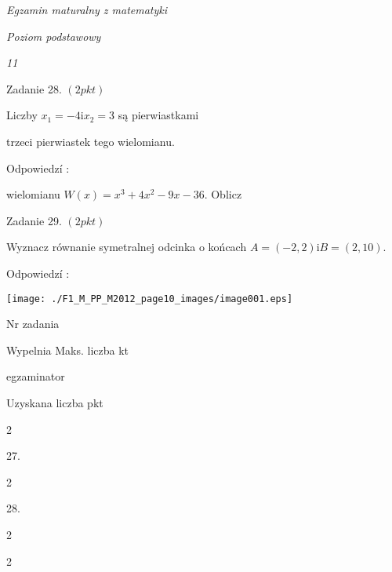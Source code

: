 \documentclass[a4paper,12pt]{article}
\begin{document}
{\it Egzamin maturalny z matematyki}

{\it Poziom podstawowy}

{\it 11}

Zadanie 28. $(2pkt)$

Liczby $x_{1}=-4 \mathrm{i} x_{2}=3$ są pierwiastkami

trzeci pierwiastek tego wielomianu.

Odpowiedzí :

wielomianu $W(x)=x^{3}+4x^{2}-9x-36$. Oblicz

Zadanie 29. $(2pkt)$

Wyznacz równanie symetralnej odcinka o końcach $A=(-2,2)\mathrm{i}B=(2,10).$

Odpowiedzí :
\begin{center}
\texttt{[image: ./F1\_M\_PP\_M2012\_page10\_images/image001.eps]}
\end{center}
Nr zadania

Wypelnia Maks. liczba kt

egzaminator

Uzyskana liczba pkt

2

27.

2

28.

2

2
\end{document}
